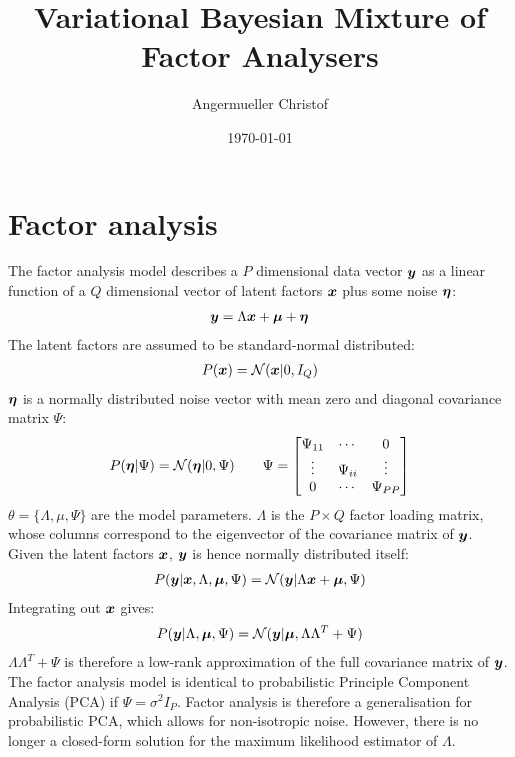 \documentclass[a4paper]{article}
\author{Angermueller Christof}
\date{\today}
\title{Variational Bayesian Mixture of Factor Analysers}
\begin{document}
\maketitle
\tableofcontents

\newpage
\section{Factor analysis}
The factor analysis model describes a $P$ dimensional data vector $\boldsymbol{y}$ as a linear function of a $Q$ dimensional vector of latent factors $\boldsymbol{x}$ plus some noise $\boldsymbol{\eta}$:
\begin{align}
  \boldsymbol{y}=\Lambda\boldsymbol{x}+\boldsymbol{\mu}+\boldsymbol{\eta}
\end{align}
The latent factors are assumed to be standard-normal distributed:
\begin{align}
  P(\boldsymbol{x})=\mathcal{N}(\boldsymbol{x}|0,I_Q)
\end{align}
$\boldsymbol{\eta}$ is a normally distributed noise vector with mean zero and diagonal covariance matrix $\Psi$:
\begin{align}
  P(\boldsymbol{\eta}|\Psi)=\mathcal{N}(\boldsymbol{\eta}|0,\Psi) \qquad
  \Psi=\begin{bmatrix}
    \Psi_{11} & \cdots & 0 \\
    \vdots & \Psi_{ii} & \vdots \\
    0 & \cdots & \Psi_{PP}
  \end{bmatrix}
\end{align}
$\theta=\{\Lambda, \mu, \Psi\}$ are the model parameters. $\Lambda$ is the $P\times Q$ factor loading matrix, whose columns correspond to the eigenvector of the covariance matrix of $\boldsymbol{y}$.
Given the latent factors $\boldsymbol{x}$, $\boldsymbol{y}$ is hence normally distributed itself:
\begin{align}
  P(\boldsymbol{y}|\boldsymbol{x},\Lambda,\boldsymbol{\mu},\Psi)=\mathcal{N}(\boldsymbol{y}|\Lambda\boldsymbol{x}+\boldsymbol{\mu},\Psi)
\end{align}
Integrating out $\boldsymbol{x}$ gives:
\begin{align}
  P(\boldsymbol{y}|\Lambda,\boldsymbol{\mu},\Psi)=\mathcal{N}(\boldsymbol{y}|\boldsymbol{\mu}, \Lambda\Lambda^T+\Psi)
\end{align}
$\Lambda\Lambda^T+\Psi$ is therefore a low-rank approximation of the full covariance matrix of $\boldsymbol{y}$. The factor analysis model is identical to probabilistic Principle Component Analysis (PCA) if $\Psi=\sigma^2 I_P$. Factor analysis is therefore a generalisation for probabilistic PCA, which allows for non-isotropic noise. However, there is no longer a closed-form solution for the maximum likelihood estimator of $\Lambda$.
\end{document}
